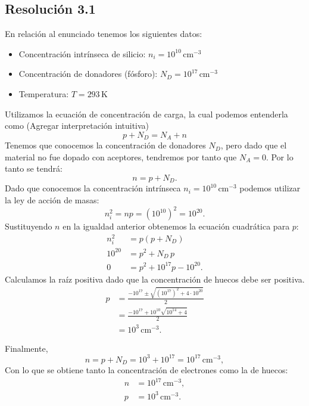 \documentclass[
  11pt,
  letterpaper,
   addpoints,
   answers
  ]{exam}
\begin{document}
\begin{questions}
\begin{solution}
    \subsection*{Resolución 3.1}
    En relación al enunciado tenemos los siguientes datos:
    \begin{itemize}
        \item Concentración intrínseca de silicio: $n_i=10^{10}\,\mathrm{cm^{-3}}$
        \item Concentración de donadores (fósforo): $N_D=10^{17}\,\mathrm{cm^{-3}}$
        \item Temperatura: $T=293\,$K
    \end{itemize}
    Utilizamos la ecuación de concentración de carga, la cual podemos entenderla como (Agregar interpretación intuitiva)
    \begin{equation}
        p + N_D = N_A + n
    \end{equation}
    Tenemos que conocemos la concentración de donadores $N_D$, pero dado que el material no fue dopado con aceptores, tendremos por tanto que $N_{A} = 0$. Por lo tanto se tendrá:
    \begin{equation}
        n = p + N_D.
    \end{equation}
    Dado que conocemos la concentración intrínseca $n_i=10^{10}\,\mathrm{cm^{-3}}$ podemos utilizar la ley de acción de masas:
    \begin{equation}
        n_i^2 = np = (10^{10})^2 = 10^{20}.
    \end{equation}
    Sustituyendo $n$ en la igualdad anterior obtenemos la ecuación cuadrática para $p$:
    \begin{align}
        n_i^2 &= p(p+N_D) \\
        10^{20} &= p^2 + N_D\,p \\
       0 &=  p^2 + 10^{17}p - 10^{20}.
    \end{align}
    Calculamos la raíz positiva dado que la concentración de huecos debe ser positiva.
    \begin{align}
        p &= \frac{-10^{17} \pm \sqrt{(10^{17})^2 + 4\cdot10^{20}}}{2} \\
          &= \frac{-10^{17} + 10^{10}\sqrt{10^{14}+4}}{2}\\
          &=10^{3}\,\mathrm{cm^{-3}}.
    \end{align}

    Finalmente,
    \begin{equation}
        n = p + N_D = 10^{3} + 10^{17} = 10^{17}\,\mathrm{cm^{-3}},
    \end{equation}
Con lo que se obtiene tanto la concentración de electrones como la de huecos:
\begin{align}
    n &=10^{17}\,\mathrm{cm^{-3}}, \\
    p &= 10^{3}\,\mathrm{cm^{-3}}.
\end{align}

\end{solution}
\end{questions}
\end{document}
